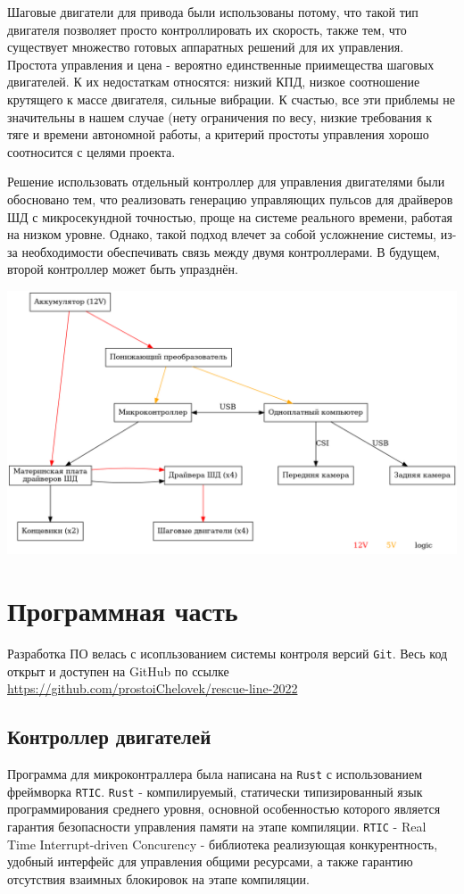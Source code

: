 \documentclass[11pt]{article}
\begin{document}
Шаговые двигатели для привода были использованы потому, что такой тип двигателя позволяет просто контроллировать их скорость, также тем, что существует множество готовых аппаратных решений для их управления. Простота управления и цена - вероятно единственные приимещества шаговых двигателей. К их недостаткам относятся: низкий КПД, низкое соотношение крутящего к массе двигателя, сильные вибрации. К счастью, все эти приблемы не значительны в нашем случае (нету ограничения по весу, низкие требования к тяге и времени автономной работы, а критерий простоты управления хорошо соотносится с целями проекта.

Решение использовать отдельный контроллер для управления двигателями были обосновано тем, что реализовать генерацию управляющих пульсов для драйверов ШД с микросекундной точностью, проще на системе реального времени, работая на низком уровне. Однако, такой подход влечет за собой усложнение системы, из-за необходимости обеспечивать связь между двумя контроллерами. В будущем, второй контроллер может быть упразднён.

\begin{center}
\includegraphics[width=.9\linewidth]{images/electronics-diag.png}
\end{center}
\section{Программная часть}
\label{sec:orgcaf9a01}
Разработка ПО велась с исопльзованием системы контроля версий \texttt{Git}. Весь код открыт и доступен на GitHub по ссылке \url{https://github.com/prostoiChelovek/rescue-line-2022}
\subsection{Контроллер двигателей}
\label{sec:org568d73d}
Программа для микроконтраллера была написана на \texttt{Rust} с использованием фреймворка \texttt{RTIC}. \texttt{Rust} - компилируемый, статически типизированный язык программирования среднего уровня, основной особенностью которого является гарантия безопасности управления памяти на этапе компиляции. \texttt{RTIC} - Real Time Interrupt-driven Concurency - библиотека реализующая конкурентность, удобный интерфейс для управления общими ресурсами, а также гарантию отсутствия взаимных блокировок на этапе компиляции.
\end{document}
